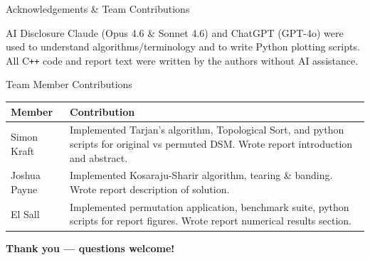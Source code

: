 \documentclass[aspectratio=169]{beamer}
\begin{document}
\begin{frame}{Acknowledgements \& Team Contributions}
  \small
  \begin{block}{AI Disclosure}
    \small Claude (Opus 4.6 \& Sonnet 4.6) and ChatGPT (GPT-4o) were used to understand algorithms/terminology and to write Python plotting scripts. All C\texttt{++} code and report text were written by the authors without AI assistance.
  \end{block}

  \vspace{0.3em}
  \begin{block}{Team Member Contributions}
    \small
    \begin{tabular}{l p{}}
      \toprule
      \textbf{Member} & \textbf{Contribution} \\
      \midrule
      Simon Kraft   & Implemented Tarjan's algorithm, Topological Sort, and python scripts for original vs permuted DSM. Wrote report introduction and abstract. \\
      Joshua Payne  & Implemented Kosaraju-Sharir algorithm, tearing \& banding. Wrote report description of solution. \\
      El Sall       & Implemented permutation application, benchmark suite, python scripts for report figures. Wrote report numerical results section. \\
      \bottomrule
    \end{tabular}
  \end{block}

  \centering
  \large \textbf{Thank you — questions welcome!}
\end{frame}
\end{document}

